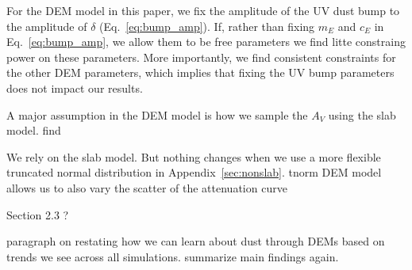 For the DEM model in this paper, we fix the amplitude of the UV dust bump to
the amplitude of $\delta$ (Eq.~\ref{eq:bump_amp}). If, rather than fixing $m_E$ and
$c_E$ in Eq.~\ref{eq:bump_amp}, we allow them to be free parameters we find
litte constraing power on these parameters. More importantly, we find
consistent constraints for the other DEM parameters, which implies that fixing
the UV bump parameters does not impact our results. 

A major assumption in the DEM model is how we sample the $A_V$ using the slab
model. \cite{salim2020} find 


We rely on the slab model. But nothing changes when we use a more flexible
truncated normal distribution in Appendix~\ref{sec:nonslab}. tnorm DEM model allows us to also vary the
scatter of the attenuation curve 

\cite{chevallard2013} Section 2.3 
\cite{trayford2015}
\cite{naranyanan2018}? 









paragraph on restating how we can learn about dust through DEMs based on trends we see
across all simulations. summarize main findings again. 

